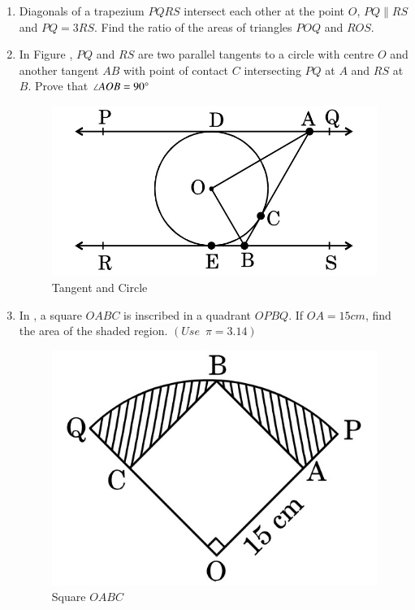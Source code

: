 \documentclass[12pt,-letter paper]{article}
\begin{document}
\begin{enumerate}
\item Diagonals of a trapezium $PQRS$ intersect each other at the point $O$,
$PQ \parallel RS$ and $PQ = 3RS$. Find the ratio of the areas of triangles $POQ$ and $ROS$.

\item In Figure , $PQ$ and $RS$ are two parallel tangents to a circle with centre $O$ and another tangent $AB$ with point of contact $C$ intersecting $PQ$ at $A$ and $RS$ at $B$. Prove that $\angle AOB = 90 \degree$
\begin{figure}[H]
    \centering
    \includegraphics[width=\columnwidth]{img3.jpg}
    \caption{Tangent and Circle}
    \label{fig:Fig_3}
\end{figure}

\item In  , a square $OABC$ is inscribed in a quadrant $OPBQ$. If $OA = 15 cm$, find the area of the shaded region. $(Use \hspace{6pt}\pi = 3.14)$
\begin{figure}[H]
    \centering
    \includegraphics[width=\columnwidth]{img4.jpg}
    \caption{Square $OABC$}
    \label{fig:Fig_4}
\end{figure}


\end{enumerate}
\end{document}
